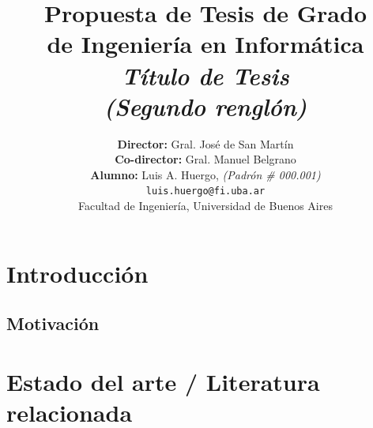 \documentclass[12pt]{article}
\begin{document}
\begin{titlepage}

\title{     \textbf{Propuesta de Tesis de Grado \\ de Ingeniería en Informática}\\[2.5ex]
\textit{Título de Tesis \\(Segundo renglón)} }

\author{    
             \textbf{Director:} Gral. José de San Martín \\[2.5ex]
             \textbf{Co-director:} Gral. Manuel Belgrano \\[2.5ex]
             \textbf{Alumno:} Luis A. Huergo, \textit{(Padrón \# 000.001)}                                \\
                    \texttt{ luis.huergo@fi.uba.ar }                                    \\[2.5ex]
            \normalsize{Facultad de Ingeniería, Universidad de Buenos Aires}        \\
       }
\date{}

\end{titlepage}

\maketitle
\thispagestyle{empty} 

\maketitle

{
  \hypersetup{linkcolor=black}
  \tableofcontents
}


\section{Introducción}

\subsection{Motivación}

\bigskip


\section{Estado del arte / Literatura relacionada}
\end{document}
